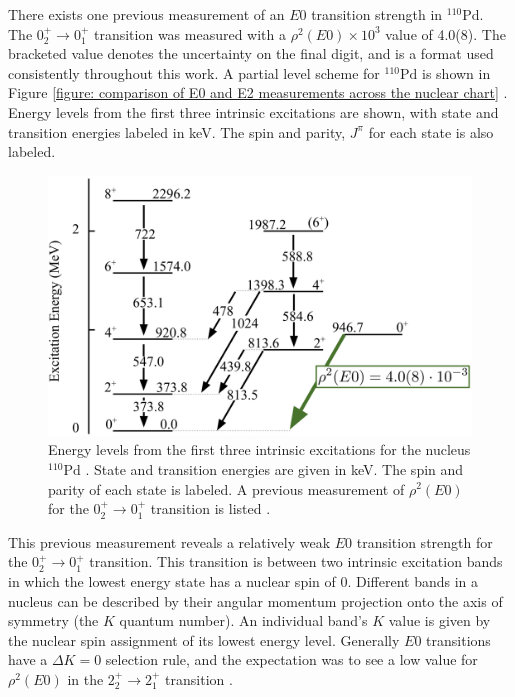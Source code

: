 There exists one previous measurement of an $E0$ transition strength in $^{110}\mathrm{Pd}$. The $0_2^+ \rightarrow 0^+_1$ transition was measured with a $\rho^2(E0) \times 10^3$ value of 4.0(8). The bracketed value denotes the uncertainty on the final digit, and is a format used consistently throughout this work. A partial level scheme for $^{110}\mathrm{Pd}$ is shown in Figure \ref{figure: comparison of E0 and E2 measurements across the nuclear chart} \cite{ENSDF110Pd}. Energy levels from the first three intrinsic excitations are shown, with state and transition energies labeled in keV. The spin and parity, $J^\pi$ for each state is also labeled.  

\begin{figure}[!ht]
  \centering
  \includegraphics[width=\textwidth]{intro_110Pd_E0.png}
  \caption[Partial level scheme for the nucleus $^{110}$Pd with a previous measurement of $\rho^2(E0)$ highlighted.]{Energy levels from the first three intrinsic excitations for the nucleus $^{110}\mathrm{Pd}$ \cite{ENSDF110Pd}. State and transition energies are given in keV. The spin and parity of each state is labeled. A previous measurement of $\rho^2(E0)$ for the $0^+_2 \rightarrow 0^+_1$ transition is listed \cite{Kibedi2005}.}
  \label{figure: levels of 110Pd}
\end{figure}

This previous measurement reveals a relatively weak $E0$ transition strength for the $0_2^+ \rightarrow 0^+_1$ transition. This transition is between two intrinsic excitation bands in which the lowest energy state has a nuclear spin of 0. Different bands in a nucleus can be described by their angular momentum projection onto the axis of symmetry (the $K$ quantum number). An individual band's $K$ value is given by the nuclear spin assignment of its lowest energy level. Generally $E0$ transitions have a $\Delta K = 0$ selection rule, and the expectation was to see a low value for $\rho^2(E0)$ in the $2^+_2 \rightarrow 2^+_1$ transition \cite{CastenText}. 

